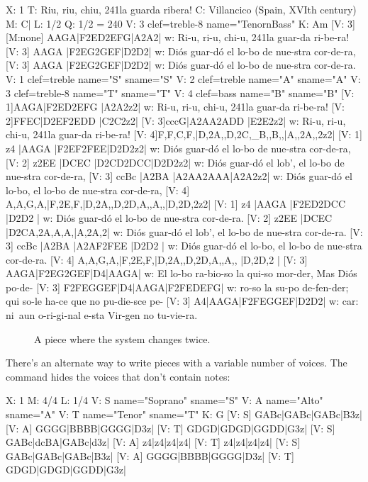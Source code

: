 \documentclass[a4paper,12pt]{book}
\begin{document}
{\small
\begin{abcsource}
X: 1
T: Riu, riu, chiu, \bl{}241la guarda ribera!
C: Villancico (Spain, XVIth century)
M: C|
L: 1/2
Q: 1/2 = 240
V: 3 clef=treble-8 name="Tenor\bl{}nBass"
K: Am
[V: 3] [M:none] AAGA|F2ED2EFG|A2A2|
w: Ri-u, ri-u, chi-u, \bl{}241la guar-da ri-be-ra!
[V: 3] AAGA         |F2EG2GEF|D2D2|
w: Di\'os guar-d\'o el lo-bo de nue-stra cor-de-ra,
[V: 3] AAGA         |F2EG2GEF|D2D2|
w: Di\'os guar-d\'o el lo-bo de nue-stra cor-de-ra.
V: 1 clef=treble   name="S" sname="S"
V: 2 clef=treble   name="A" sname="A"
V: 3 clef=treble-8 name="T" sname="T"
V: 4 clef=bass     name="B" sname="B"
[V: 1]AAGA|F2ED2EFG |A2A2z2|
w: Ri-u, ri-u, chi-u, \bl{}241la guar-da ri-be-ra!
[V: 2]FFEC|D2EF2EDD |C2C2z2|
[V: 3]cccG|A2AA2ADD |E2E2z2|
w: Ri-u, ri-u, chi-u, \bl{}241la guar-da ri-be-ra!
[V: 4]F,F,C,F,|D,2A,,D,2C,_B,,B,,|A,,2A,,2z2|
%
[V: 1] z4      |AAGA   |F2EF2FEE|D2D2z2|
w: Di\'os guar-d\'o el lo-bo de nue-stra cor-de-ra,
[V: 2] z2EE    |DCEC   |D2CD2DCC|D2D2z2|
w: Di\'os guar-d\'o el lob', el lo-bo de nue-stra cor-de-ra,
[V: 3] ccBc    |A2BA   |A2AA2AAA|A2A2z2|
w: Di\'os guar-d\'o el lo-bo, el lo-bo de nue-stra cor-de-ra,
[V: 4] A,A,G,A,|F,2E,F,|D,2A,,D,2D,A,,A,,|D,2D,2z2|
%
[V: 1] z4      |AAGA   |F2ED2DCC    |D2D2  |
w: Di\'os guar-d\'o el lo-bo de nue-stra cor-de-ra.
[V: 2] z2EE    |DCEC   |D2CA,2A,A,A,|A,2A,2|
w: Di\'os guar-d\'o el lob', el lo-bo de nue-stra cor-de-ra.
[V: 3] ccBc    |A2BA   |A2AF2FEE    |D2D2  |
w: Di\'os guar-d\'o el lo-bo, el lo-bo de nue-stra cor-de-ra.
[V: 4] A,A,G,A,|F,2E,F,|D,2A,,D,2D,A,,A,,  |D,2D,2  |
[V: 3] AAGA|F2EG2GEF|D4|AAGA|
w: El lo-bo ra-bio-so la qui-so mor-der, Mas Di\'os po-de-
[V: 3] F2FEGGEF|D4|AAGA|F2FEDEFG|
w: ro-so la su-po de-fen-der; qui so-le ha-ce que no pu-die-sce pe-
[V: 3] A4|AAGA|F2FEGGEF|D2D2|
w: car: ni~aun o-ri-gi-nal e-sta Vir-gen no tu-vie-ra.
\end{abcsource}
}

\begin{figure}[htbp]
\caption{A piece where the system changes twice.}
\label{fig:riuriuchiu}
\end{figure}

There's an alternate way to write pieces with a variable number of
voices. The command  hides the voices that
don't contain notes:

\begin{abcsource}
X: 1
M: 4/4
L: 1/4
V: S name="Soprano" sname="S"
V: A name="Alto"    sname="A"
V: T name="Tenor"   sname="T"
K: G
[V: S] GABc|GABc|GABc|B3z|
[V: A] GGGG|BBBB|GGGG|D3z|
[V: T] GDGD|GDGD|GGDD|G3z|
%
[V: S] GABc|dcBA|GABc|d3z|
[V: A] z4|z4|z4|z4|
[V: T] z4|z4|z4|z4|
%
[V: S] GABc|GABc|GABc|B3z|
[V: A] GGGG|BBBB|GGGG|D3z|
[V: T] GDGD|GDGD|GGDD|G3z|
\end{abcsource}
\end{document}
